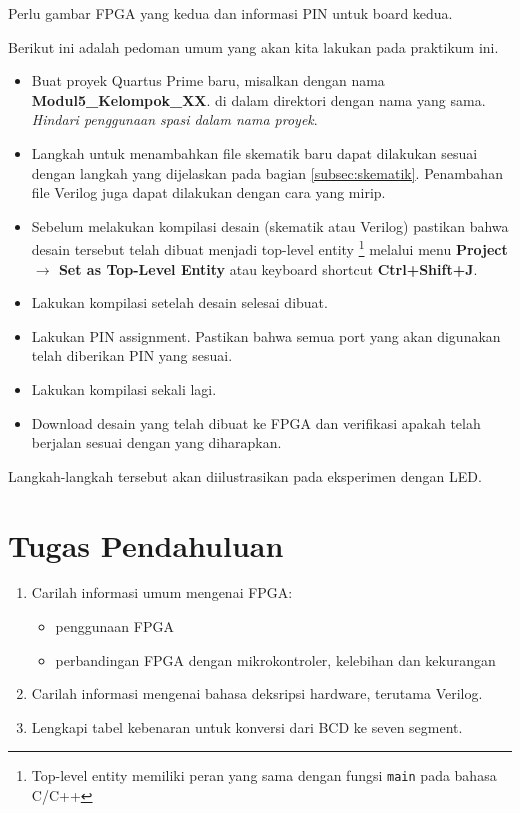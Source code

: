 \documentclass[a4paper,12pt,bahasa]{extarticle}
\begin{document}
{\color{red}Perlu gambar FPGA yang kedua dan informasi PIN untuk board kedua.}

Berikut ini adalah pedoman umum yang akan kita lakukan pada praktikum ini.

\begin{itemize}

\item Buat proyek Quartus Prime baru, misalkan dengan nama \textbf{Modul5\_Kelompok\_XX}.
di dalam direktori dengan nama yang sama. \textit{Hindari penggunaan
spasi dalam nama proyek}.

\item Langkah untuk menambahkan file skematik baru dapat dilakukan sesuai dengan langkah yang
dijelaskan pada bagian \ref{subsec:skematik}. Penambahan file Verilog
juga dapat dilakukan dengan cara yang mirip.

\item Sebelum melakukan kompilasi desain (skematik atau Verilog)
pastikan bahwa desain tersebut telah dibuat menjadi top-level entity
\footnote{Top-level entity memiliki peran yang sama
dengan fungsi \texttt{main} pada bahasa C/C++}
melalui menu \textbf{Project $\rightarrow$ Set as Top-Level Entity} atau
keyboard shortcut \textbf{Ctrl+Shift+J}.

\item Lakukan kompilasi setelah desain selesai dibuat.

\item Lakukan PIN assignment. Pastikan bahwa semua port yang akan digunakan
telah diberikan PIN yang sesuai.

\item Lakukan kompilasi sekali lagi.

\item Download desain yang telah dibuat ke FPGA dan verifikasi apakah telah berjalan
sesuai dengan yang diharapkan.
\end{itemize}

Langkah-langkah tersebut akan diilustrasikan pada eksperimen dengan LED.






\section{Tugas Pendahuluan}

\begin{enumerate}

\item Carilah informasi umum mengenai FPGA:
\begin{itemize}
\item penggunaan FPGA
\item perbandingan FPGA dengan mikrokontroler, kelebihan dan kekurangan
\end{itemize}

\item Carilah informasi mengenai bahasa deksripsi hardware, terutama Verilog.

\item Lengkapi tabel kebenaran untuk konversi dari BCD ke seven segment.
\end{enumerate}
\end{document}
